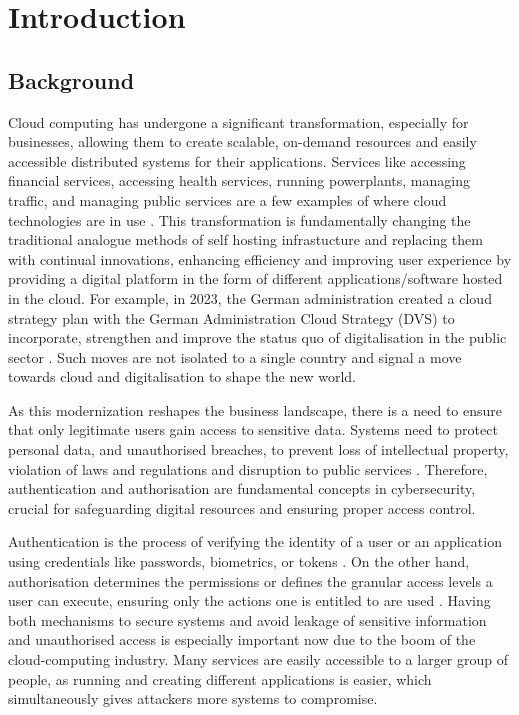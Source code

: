 \chapter{Introduction}
\section{Background}
Cloud computing has undergone a significant transformation, especially for businesses, allowing them to create scalable, on-demand resources and easily accessible distributed systems for their applications. Services like accessing financial services, accessing health services, running powerplants, managing traffic, and managing public services are a few examples of where cloud technologies are in use \citep{intro_cloud_critical_infra}. This transformation is fundamentally changing the traditional analogue methods of self hosting infrastucture and replacing them with continual innovations, enhancing efficiency and improving user experience by providing a digital platform in the form of different applications/software hosted in the cloud. For example, in 2023, the German administration created a cloud strategy plan with the German Administration Cloud Strategy (DVS) to incorporate, strengthen and improve the status quo of digitalisation in the public sector \citep{german_gov_cloud_plan}. Such moves are not isolated to a single country and signal a move towards cloud and digitalisation to shape the new world. \newline

As this modernization reshapes the business landscape, there is a need to ensure that
only legitimate users gain access to sensitive data. Systems need to protect personal
data, and unauthorised breaches, to prevent loss of intellectual property,
violation of laws and regulations and disruption to public services \citep{critical_infra_reason}. Therefore, authentication and authorisation are fundamental concepts in cybersecurity, crucial for safeguarding digital resources and ensuring proper access control. \newline

Authentication is the process of verifying the identity of a user or an application using credentials like passwords, biometrics, or tokens \citep{authetication_intro}. On the other hand, authorisation determines the permissions or defines the granular access levels a user can execute, ensuring only the actions one is entitled to are used \citep{Gollmann2021-at}. Having both mechanisms to secure systems and avoid leakage of sensitive information and unauthorised access is especially important now due to the boom of the cloud-computing industry. Many services are easily accessible to a larger group of people, as running and creating different applications is easier, which simultaneously gives attackers more systems to compromise.\newline

